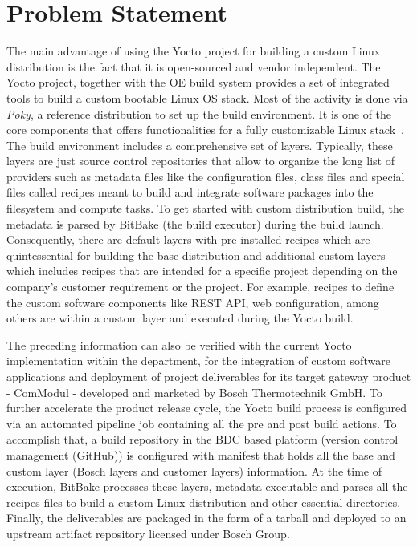 \section{Problem Statement} \label{section:problemstatement}

The main advantage of using the Yocto project for building a custom Linux distribution is the fact that it is open-sourced and vendor independent. The Yocto project, together with the \ac{OE} build system provides a set of integrated tools to build a custom bootable Linux \ac{OS} stack. Most of the activity is done via \emph{Poky}, a reference distribution to set up the build environment. It is one of the core components that offers functionalities for a fully customizable Linux stack~\parencite{vaduva2015learning}. The build environment includes a comprehensive set of layers. Typically, these layers are just source control repositories that allow to organize the long list of providers such as metadata files like the configuration files, class files and special files called recipes meant to build and integrate software packages into the filesystem and compute tasks. To get started with custom distribution build, the metadata is parsed by BitBake (the build executor) during the build launch. Consequently, there are default layers with pre-installed recipes which are quintessential for building the base distribution and additional custom layers which includes recipes that are intended for a specific project depending on the company's customer requirement or the project. For example, recipes to define the custom software components like \ac{REST} \ac{API}, web configuration, among others are within a custom layer and executed during the Yocto build. 

The preceding information can also be verified with the current Yocto implementation within the department, for the integration of custom software applications and deployment of project deliverables for its target gateway product - ComModul - developed and marketed by Bosch Thermotechnik GmbH. To further accelerate the product release cycle, the Yocto build process is configured via an automated pipeline job containing all the pre and post build actions. To accomplish that, a build repository in the \ac{BDC} based platform (version control management (GitHub)) is configured with manifest that holds all the base and custom layer (Bosch layers and customer layers) information. At the time of execution, BitBake processes these layers, metadata executable and parses all the recipes files to build a custom Linux distribution and other essential directories. Finally, the deliverables are packaged in the form of a tarball and deployed to an upstream artifact repository licensed under Bosch Group. 

